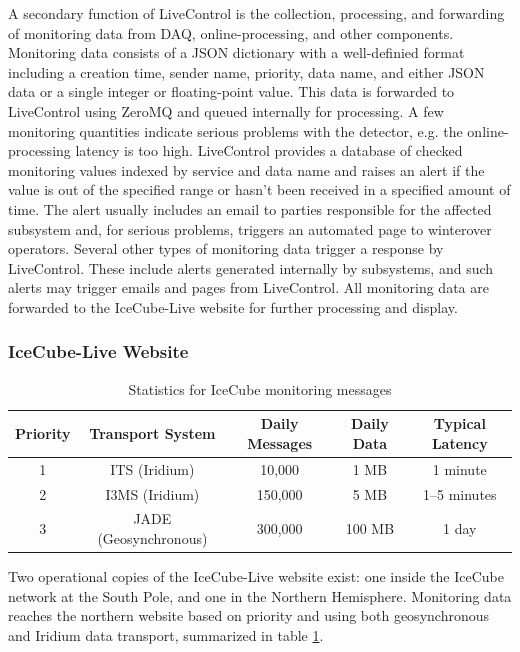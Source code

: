 A secondary function of LiveControl is the collection, processing, and forwarding of monitoring data from DAQ, online-processing, and other components.
Monitoring data consists of a JSON dictionary with a well-definied format including a creation time, sender name, priority, data name, and either JSON data
or a single integer or floating-point value.  This data is forwarded to LiveControl using ZeroMQ and queued internally for processing.  A few monitoring
quantities indicate serious problems with the detector, e.g. the online-processing latency is too high.  LiveControl provides a database of checked monitoring
values indexed by service and data name and raises an alert if the value is out of the specified range or hasn't been received in a specified amount of time.
The alert usually includes an email to parties responsible for the affected subsystem and, for serious problems, triggers an automated page to winterover operators.
Several other types of monitoring data trigger a response by LiveControl.  These include alerts generated internally by subsystems, and such alerts may trigger emails
and pages from LiveControl.  All monitoring data are forwarded to the IceCube-Live website for further processing and display.

\subsubsection{IceCube-Live Website}

\begin{table}[!ht]
\begin{tabular}{|c|c|c|c|c|}
\hline
Priority & Transport System & Daily Messages & Daily Data & Typical Latency\\
\hline
1 & ITS (Iridium) & 10,000 & 1 MB & 1 minute \\
\hline
2 & I3MS (Iridium) & 150,000 & 5 MB & 1--5 minutes \\
\hline
3 & JADE (Geosynchronous) & 300,000 & 100 MB & 1 day \\
\hline
\end{tabular}
\caption{Statistics for IceCube monitoring messages}
\label{i3messages}
\end{table}

Two operational copies of the IceCube-Live website exist: one inside the IceCube network at the South Pole, and
one in the Northern Hemisphere.  Monitoring data reaches the northern website based on priority and using
both geosynchronous and Iridium data transport, summarized in table \ref{i3messages}.

